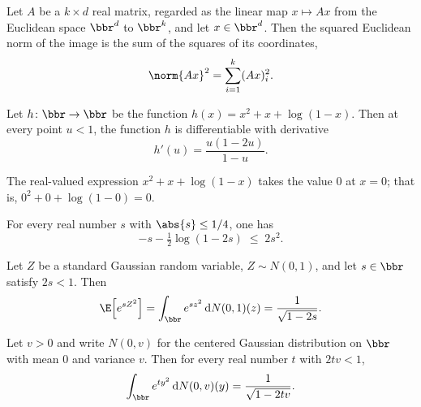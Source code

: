 \begin{lemma}
\label{norm_sq_toEuclideanLin}
\leanok
{}
Let $A$ be a $k \times d$ real matrix, regarded as the linear map $x \mapsto Ax$ from
the Euclidean space $\bbr^d$ to $\bbr^k$, and let $x \in \bbr^d$. Then the squared
Euclidean norm of the image is the sum of the squares of its coordinates,
\[
  \norm{Ax}^2 = \sum_{i=1}^{k} (Ax)_i^2 .
\]
\end{lemma}

\begin{lemma}
\label{taylorAux_hasDerivAt}
\leanok
{}
Let $h \colon \bbr \to \bbr$ be the function $h(x) = x^2 + x + \log(1 - x)$. Then at
every point $u < 1$, the function $h$ is differentiable with derivative
\[
h'(u) = \frac{u(1 - 2u)}{1 - u}.
\]
\end{lemma}

\begin{lemma}
\label{taylorAux_zero}
\leanok
{}
The real-valued expression $x^2 + x + \log(1 - x)$ takes the value $0$ at $x = 0$; that
is, $0^2 + 0 + \log(1 - 0) = 0$.
\end{lemma}

\begin{lemma}
\label{neg_log_one_sub_two_mul_le_two_sq}
\leanok
{}
For every real number $s$ with $\abs{s} \le 1/4$, one has
\[
  -s - \tfrac{1}{2}\log(1 - 2s) \;\le\; 2s^2 .
\]
\end{lemma}

\begin{lemma}
\label{integral_exp_mul_sq_standardGaussian}
\leanok
{}
Let $Z$ be a standard Gaussian random variable, $Z \sim N(0,1)$, and let $s \in \bbr$
satisfy $2s < 1$. Then
\[
  \E\!\left[e^{s Z^2}\right]
  = \int_{\bbr} e^{s z^2}\, \mathrm{d}N(0,1)(z)
  = \frac{1}{\sqrt{1 - 2s}}.
\]
\end{lemma}

\begin{lemma}
\label{integral_exp_mul_sq_gaussianReal_zero}
\leanok
{}
Let $v > 0$ and write $N(0,v)$ for the centered Gaussian distribution on $\bbr$ with
mean $0$ and variance $v$. Then for every real number $t$ with $2tv < 1$,
\[
  \int_{\bbr} e^{t y^2}\, \mathrm{d}N(0,v)(y) = \frac{1}{\sqrt{1 - 2tv}}.
\]
\end{lemma}


